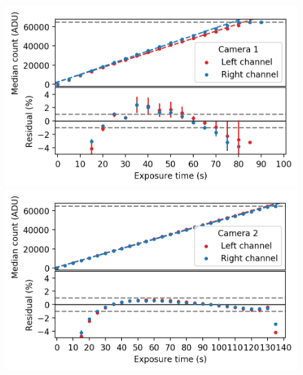 \begin{colsection}
\begin{figure}[p]
    \begin{center}
        \begin{minipage}[t]{0.47\linewidth}\vspace{10pt}
            \includegraphics[width=\linewidth]{images/detectors/lin_1.png}
        \end{minipage}
        \begin{minipage}[t]{0.47\linewidth}\vspace{10pt}
            \includegraphics[width=\linewidth]{images/detectors/lin_2.png}
        \end{minipage}


\end{center}
\end{figure}
\end{colsection}
